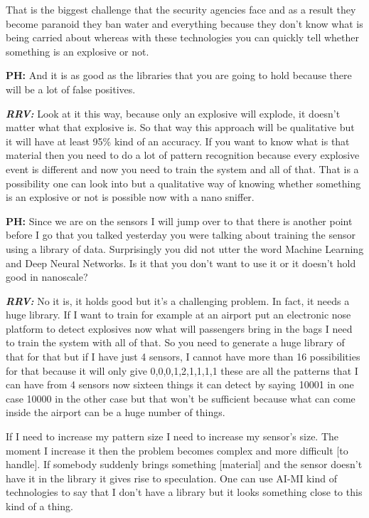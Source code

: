 That is the biggest challenge that the security agencies face and as a result they become paranoid they ban water and everything because they don’t know what is being carried about whereas with these technologies you can quickly tell whether something is an explosive or not.

\textbf{PH:} And it is as good as the libraries that you are going to hold because there will be a lot of false positives.

\textbf{\textit{RRV:}} Look at it this way, because only an explosive will explode, it doesn’t matter what that explosive is. So that way this approach will be qualitative but it will have at least 95\% kind of an accuracy. If you want to know what is that material then you need to do a lot of pattern recognition because every explosive event is different and now you need to train the system and all of that. That is a possibility one can look into but a qualitative way of knowing whether something is an explosive or not is possible now with a nano sniffer.

\textbf{PH:} Since we are on the sensors I will jump over to that there is another point before I go that you talked yesterday you were talking about training the sensor using a library of data. Surprisingly you did not utter the word Machine Learning and Deep Neural Networks. Is it that you don’t want to use it or it doesn’t hold good in nanoscale? 

\textbf{\textit{RRV:}} No it is, it holds good but it’s a challenging problem. In fact, it needs a huge library. If I want to train for example at an airport put an electronic nose platform to detect explosives now what will passengers bring in the bags I need to train the system with all of that. So you need to generate a huge library of that for that but if I have just 4 sensors, I cannot have more than 16 possibilities for that because it will only give 0,0,0,1,2,1,1,1,1 these are all the patterns that I can have from 4 sensors now sixteen things it can detect by saying 10001 in one case 10000 in the other case but that won’t be sufficient because what can come inside the airport can be a huge number of things. 

If I need to increase my pattern size I need to increase my sensor’s size. The moment I increase it then the problem becomes complex and more difficult [to handle]. If somebody suddenly brings something [material] and the sensor doesn’t have it in the library it gives rise to speculation. One can use AI-MI kind of technologies to say that I don’t have a library but it looks something close to this kind of a thing.

